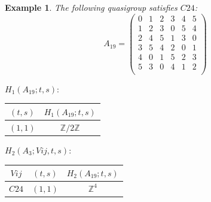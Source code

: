 \documentclass[11pt]{amsart}
\newtheorem{example}[theorem]{Example}
\theoremstyle{definition}
\newcommand{\Z}{\mathbb{Z}}
\begin{document}
\begin{example}
The following quasigroup satisfies 
$C24$:
   \[ A_{19} = \left(
\begin{array}{cccccc}
 0 & 1 & 2 & 3 & 4 & 5 \\
 1 & 2 & 3 & 0 & 5 & 4 \\
 2 & 4 & 5 & 1 & 3 & 0 \\
 3 & 5 & 4 & 2 & 0 & 1 \\
 4 & 0 & 1 & 5 & 2 & 3 \\
 5 & 3 & 0 & 4 & 1 & 2 \\
\end{array}
\right)\]


\bigskip


$H_1(A_{19};t,s):$

\begin{center}
    
\begin{tabular}{c|c}
    $(t,s)$ & $H_1(A_{19};t,s)$  \\
    \hline
    $(1,1)$ & $\Z/2\Z$ \\
\end{tabular}
\end{center}
\bigskip

$H_2(A_3;Vij,t,s):$

\begin{center}
    
\begin{tabular}{c|c|c}
    $Vij$ & $(t,s)$ & $H_2(A_{19};t,s)$  \\
    \hline
    $C24$ & $(1,1)$ & $\Z^4$ \\
\end{tabular}

\end{center}

\end{example}

\iffalse
\end{document}
